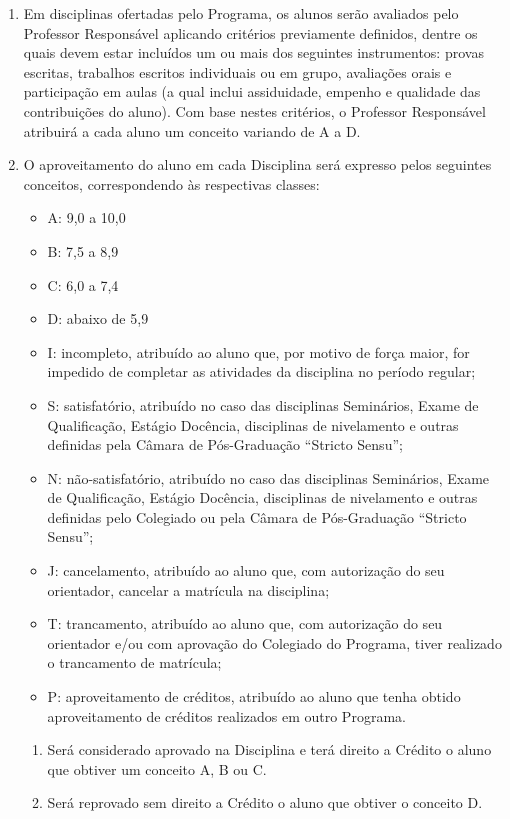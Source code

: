 \documentclass{article}
\newcommand{\grupoMenor}{Colegiado\xspace}
\begin{document}
\begin{enumerate}
	\item Em disciplinas ofertadas pelo Programa, os alunos serão avaliados pelo Professor Responsável aplicando critérios previamente definidos, dentre os quais devem estar incluídos um ou mais dos seguintes instrumentos: provas escritas, trabalhos escritos individuais ou em grupo, avaliações orais e participação em aulas (a qual inclui assiduidade, empenho e qualidade das contribuições do aluno). Com base nestes critérios, o Professor Responsável atribuirá a cada aluno um conceito variando de A a D.
	
	\item O aproveitamento do aluno em cada Disciplina será expresso pelos seguintes conceitos, correspondendo às respectivas classes:
	\begin{itemize}
		\item A: 9,0 a 10,0
		\item B: 7,5 a 8,9
		\item C: 6,0 a 7,4 
		\item D: abaixo de 5,9
		\item I: incompleto, atribuído ao aluno que, por motivo de força maior, for impedido de completar as atividades da disciplina no período regular;
		\item S: satisfatório, atribuído no caso das disciplinas Seminários, Exame de Qualificação, Estágio Docência, disciplinas de nivelamento e outras definidas pela Câmara de Pós-Graduação ``Stricto Sensu'';
		\item N: não-satisfatório, atribuído no caso das disciplinas Seminários, Exame de Qualificação, Estágio Docência, disciplinas de nivelamento e outras definidas pelo \grupoMenor ou pela Câmara de Pós-Graduação ``Stricto Sensu'';
		\item J: cancelamento, atribuído ao aluno que, com autorização do seu orientador, cancelar a matrícula na disciplina;
		\item T: trancamento, atribuído ao aluno que, com autorização do seu orientador e/ou com aprovação do \grupoMenor do Programa, tiver realizado o trancamento de matrícula;
		\item P: aproveitamento de créditos, atribuído ao aluno que tenha obtido aproveitamento de créditos realizados em outro Programa.
	\end{itemize}

	\begin{enumerate}
		\item Será considerado aprovado na Disciplina e terá direito a Crédito o aluno que obtiver um conceito A, B ou C.
		\item Será reprovado sem direito a Crédito o aluno que obtiver o conceito D.
	\end{enumerate}


\end{enumerate}
\end{document}
